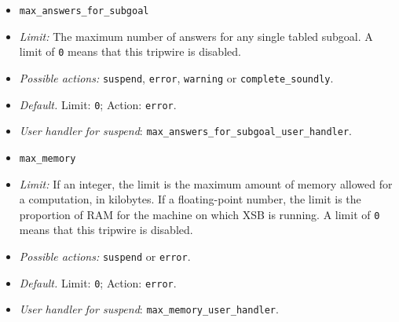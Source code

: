\begin{itemize}
\item {\tt max\_answers\_for\_subgoal}
\bi  
\item {\em Limit:} The maximum number of answers for any single tabled
 subgoal.  A limit of {\tt 0} means that
 this tripwire is disabled.
\item{\em Possible actions:} {\tt suspend}, {\tt error}, {\tt warning}
 or {\tt complete\_soundly}.
\item {\em Default.} Limit: {\tt 0}; Action: {\tt error}.
\item {\em User handler for suspend}: {\tt max\_answers\_for\_subgoal\_user\_handler}.
\ei

\item {\tt max\_memory}
\bi  
\item {\em Limit:} If an integer, the limit is the maximum
 amount of memory allowed for a computation, in kilobytes.  If a
 floating-point number, the limit is the proportion of RAM for the
 machine on which XSB is running.  A limit of {\tt 0} means that
 this tripwire is disabled.
\item{\em Possible actions:} {\tt suspend} or {\tt error}. 
\item {\em Default.} Limit: {\tt 0}; Action: {\tt error}.
\item {\em User handler for suspend}: {\tt max\_memory\_user\_handler}.
\ei

\end{itemize}

